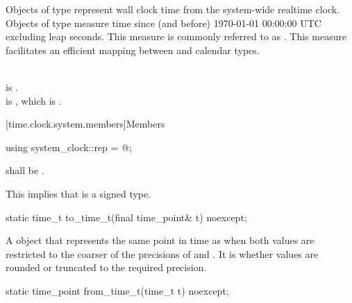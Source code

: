 \pnum
Objects of type  represent wall clock time from the system-wide
realtime clock.
Objects of type  measure time since (and before)
1970-01-01 00:00:00 UTC excluding leap seconds.
This measure is commonly referred to as .
This measure facilitates an efficient mapping between
 and calendar types.
\begin{example} \\
 is . \\
 is ,
which is . \\
\end{example}

[time.clock.system.members]{Members}

%
\begin{itemdecl}
using system_clock::rep = @\unspec@;
\end{itemdecl}

\begin{itemdescr}
\pnum
\requires {} shall
be .\\
\begin{note} This implies that  is a signed type. \end{note}
\end{itemdescr}

%
\begin{itemdecl}
static time_t to_time_t(final time_point& t) noexcept;
\end{itemdecl}

\begin{itemdescr}
\pnum
\returns A  object that represents the same point in time as 
when both values are restricted to the coarser of the precisions of  and
.
It is 
whether values are rounded or truncated to the required precision.
\end{itemdescr}

%
\begin{itemdecl}
static time_point from_time_t(time_t t) noexcept;
\end{itemdecl}

